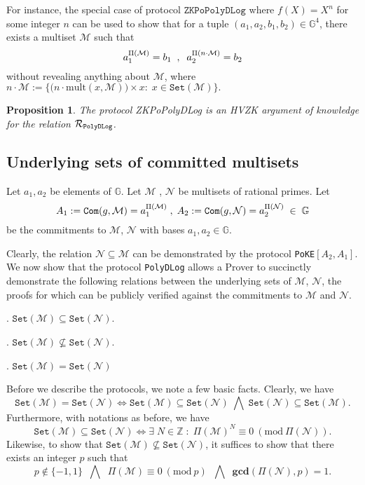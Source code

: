 \documentclass[11pt, lettersize, notitlepage, leqno, footskip=0.6cm]{article}
\newcommand{\bz}{\mathbb Z}
\newcommand{\ttt}{\texttt}
\newcommand{\bG}{\mathbb{G}}
\newcommand{\sett}{\ttt{Set}}
\newcommand{\mult}{\mr{mult}}
\newcommand{\LRA}{\Longleftrightarrow}
\newcommand{\mc}{\mathcal}
\newcommand{\mb}{\mathbb}
\newcommand{\mbf}{\mathbf}
\newcommand{\mr}{\mathrm}
\newcommand{\sub}{\subseteq}
\newcommand{\nsub}{\nsubseteq}
\newcommand{\mcM}{\mc{M}}
\newcommand{\vs}{\vspace{-0.15cm}}
\newcommand{\noin}{\noindent}
\newcommand{\Mod}[1]{\ (\mathrm{mod}\ #1)}
\newcommand{\GCD}{\mbf{gcd}}
\newtheorem{Prop}[Thm]{Proposition}
\numberwithin{equation}{section}
\begin{document}
For instance, the special case of protocol $\ttt{ZKPoPolyDLog}$ where $f(X) = X^n$ for some integer $n$ can be used to show that for a tuple $(a_1, a_2, b_1, b_2)\in \mb{G}^4$, there exists a multiset $\mcM$ such that \vs $$ a_1^{\Pi(\mcM)} = b_1\;\;,\;\; a_2^{\Pi(n\cdot\mcM)} = b_2   \vs $$ without revealing anything about $\mcM$, where $n\cdot\mcM:= \big\{\big(n\cdot \mult(x, \mcM)\big)\times x:\; x\in \sett({\mcM})\big\}.$


\begin{Prop} The protocol ZKPoPolyDLog is an HVZK argument of knowledge for the relation $\mc{R}_{\tt{PolyDLog}}$.\end{Prop}

\begin{prf} \end{prf}






\subsection{\fontsize{11}{11}\selectfont Underlying sets of committed multisets}

\noin \hypertarget{Sets}{Let $a_1,a_2$ be elements of $\mb{G}$. Let $\mc{M}$ , $\mc{N}$ be multisets of rational primes.} Let \vs $$A_1:= \ttt{Com}(g, \mc{M}) =  a_1^{\Pi(\mc{M})}\;,\; A_2:= \ttt{Com}(g, \mc{N}) = a_2^{\Pi(\mc{N})}\;\in\;\bG \vs $$ be the commitments to $\mc{M}$, $\mc{N}$ with bases $a_1, a_2\in \bG$.

Clearly, the relation $\mc{N}\sub \mc{M}$ can be demonstrated by the protocol \verb|PoKE|$[A_2, A_1]$. We now show that the protocol \verb|PolyDLog| allows a Prover to succinctly demonstrate the following relations between the underlying sets of $\mc{M}$, $\mc{N}$, the proofs for which can be publicly verified against the commitments to $\mc{M}$ and $\mc{N}$.\vspace{0.1cm}

\noin 1. $\sett(\mc{M})\sub \sett(\mc{N})$.

\noin 2. $\sett(\mc{M})\nsub \sett(\mc{N})$.

\noin 3. $\sett(\mc{M}) = \sett(\mc{N})$ \vspace{0.1cm}

\noin Before we describe the protocols, we note a few basic facts. Clearly, we have \vs $$\sett(\mc{M}) = \sett(\mc{N})\LRA \sett(\mc{M}) \sub \sett(\mc{N})\;\bigwedge\; \sett(\mc{N}) \sub \sett(\mc{M}).$$ Furthermore, with notations as before, we have \vs $$\sett(\mc{M})\sub \sett(\mc{N})\LRA \exists\; N\in\bz\;:\;\Pi(\mc{M})^N\equiv 0\Mod{\Pi(\mc{N})}.$$ Likewise, to show that $\sett(\mc{M})\nsub \sett(\mc{N})$, it suffices to show that there exists an integer $p$ such that \vs $$p\notin \{-1,1\}   \;\;\bigwedge\;\;\Pi(\mc{M})\equiv 0\Mod{p} \;\;\bigwedge\;\; \GCD(\Pi(\mc{N}),{p})=1.$$
\end{document}
